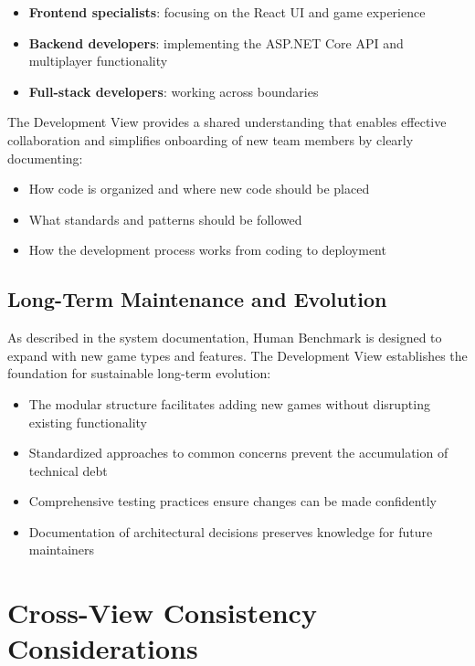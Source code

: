 \begin{itemize}
    \item \textbf{Frontend specialists}: focusing on the React UI and game experience
    \item \textbf{Backend developers}: implementing the ASP.NET Core API and multiplayer functionality
    \item \textbf{Full-stack developers}: working across boundaries
\end{itemize}

The Development View provides a shared understanding that enables effective collaboration and simplifies onboarding of new team members by clearly documenting:

\begin{itemize}
    \item How code is organized and where new code should be placed
    \item What standards and patterns should be followed
    \item How the development process works from coding to deployment
\end{itemize}

\subsection{Long-Term Maintenance and Evolution}

As described in the system documentation, Human Benchmark is designed to expand with new game types and features. The Development View establishes the foundation for sustainable long-term evolution:

\begin{itemize}
    \item The modular structure facilitates adding new games without disrupting existing functionality
    \item Standardized approaches to common concerns prevent the accumulation of technical debt
    \item Comprehensive testing practices ensure changes can be made confidently
    \item Documentation of architectural decisions preserves knowledge for future maintainers
\end{itemize}

\section{Cross-View Consistency Considerations}

